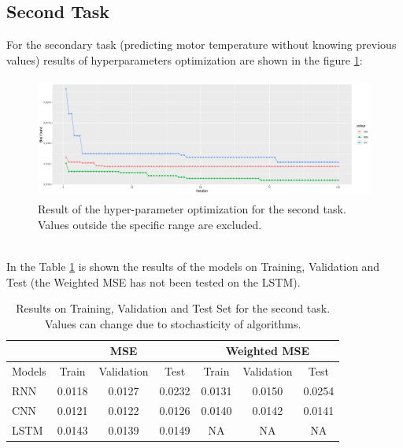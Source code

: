 \subsection{Second Task}
For the secondary task (predicting motor temperature without knowing previous values) results of hyperparameters optimization are shown in the figure \ref{fig:second_task}:
\begin{figure}[!h]
    \centering
    \includegraphics[width=\linewidth, height=4cm]{imgs/comparison_MSE_second.png}
    \caption{Result of the hyper-parameter optimization for the second task. Values outside the specific range are excluded.}
    \label{fig:second_task}
\end{figure}\\

In the Table \ref{tab:second} is shown the results of the models on Training, Validation and Test (the Weighted MSE has not been tested on the LSTM).
\begin{table}[!h]
  \centering
  \begin{tabular}{|l|c|c|c|c|c|c|}
    \hline
    & \multicolumn{3}{|c|}{MSE} & \multicolumn{3}{|c|}{Weighted MSE} \\
    \hline
    Models & Train & Validation & Test   & Train  & Validation & Test \\
    \hline
    RNN   & 0.0118 & 0.0127     & 0.0232 & 0.0131 & 0.0150     &  0.0254\\
    CNN   & 0.0121 & 0.0122     & 0.0126 & 0.0140 & 0.0142     & 0.0141\\
    LSTM  & 0.0143 & 0.0139     & 0.0149 & NA     & NA         & NA\\
    \hline
  \end{tabular}
  \caption{Results on Training, Validation and Test Set for the second task. Values can change due to stochasticity of algorithms.}
  \label{tab:second}
\end{table}\\


